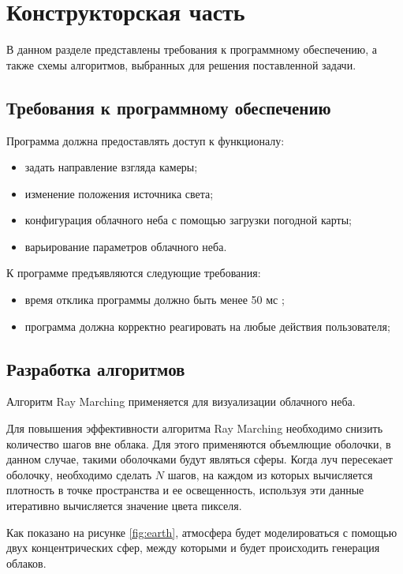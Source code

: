 \chapter{Конструкторская часть}

В данном разделе представлены требования к программному обеспечению, а также схемы алгоритмов, выбранных для решения поставленной
задачи.

\section{Требования к программному обеспечению}
Программа должна предоставлять доступ к функционалу:
\begin{itemize}
	\item задать направление взгляда камеры;
	\item изменение положения источника света;
	\item конфигурация облачного неба с помощью загрузки погодной карты;
	\item варьирование параметров облачного неба.
\end{itemize}

К программе предъявляются следующие требования:
\begin{itemize}
	\item время отклика программы должно быть менее 50 мс \cite{hzd};
	\item программа должна корректно реагировать на любые действия пользователя;
\end{itemize}

\section{Разработка алгоритмов}

Алгоритм Ray Marching применяется для визуализации облачного неба. 

Для повышения эффективности алгоритма Ray Marching необходимо снизить количество шагов вне облака. Для этого применяются объемлющие оболочки, в данном случае, такими оболочками будут являться сферы. Когда луч пересекает оболочку, необходимо сделать $ N $ шагов, на каждом из которых вычисляется плотность в точке пространства и ее освещенность, используя эти данные итеративно вычисляется значение цвета пикселя. 

Как показано на рисунке \ref{fig:earth}, атмосфера будет моделироваться с помощью двух концентрических сфер, между которыми и будет происходить генерация облаков.


